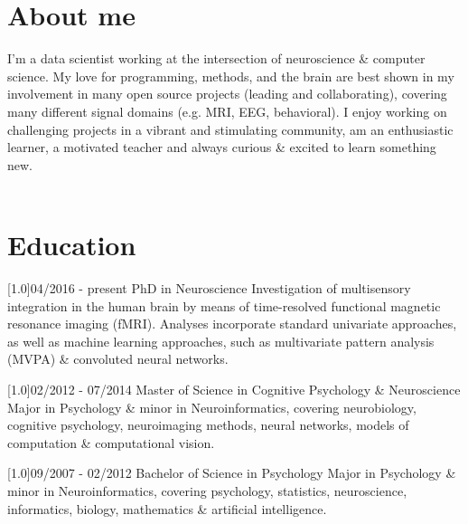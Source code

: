 \documentclass[english]{cv-style}
\begin{document}
\section{About me}
  \vspace{-0.2cm}
I'm a data scientist working at the intersection of neuroscience \& computer science. My love for programming, methods, and the brain are best shown in my involvement in many open source projects (leading and collaborating), covering many different signal domains (e.g. MRI, EEG, behavioral). I enjoy working on challenging projects in a vibrant and stimulating community, am an enthusiastic learner, a motivated teacher and always curious \& excited to learn something new.\\
~
\section{Education}
\begin{entrylist}
\entry
  {\scalebox{.8}[1.0]{04/2016 - present}}
  {PhD in Neuroscience}
  {}
  {Investigation of multisensory integration in the human brain by means of time-resolved functional magnetic resonance imaging (fMRI). Analyses incorporate standard univariate approaches, as well as machine learning approaches, such as multivariate pattern analysis (MVPA) \& convoluted neural networks.\\}
\end{entrylist}
\begin{entrylist}
\entry
  {\scalebox{.8}[1.0]{02/2012 - 07/2014}}
  {Master of Science in Cognitive Psychology \& Neuroscience}
  {}
  {Major in Psychology \& minor in Neuroinformatics, covering neurobiology, cognitive psychology, neuroimaging methods, neural networks, models of computation \& computational vision.\\}
\end{entrylist}
\begin{entrylist}
\entry
  {\scalebox{.8}[1.0]{09/2007 - 02/2012}}
  {Bachelor of Science in Psychology}
  {}
  {Major in Psychology \& minor in Neuroinformatics, covering psychology, statistics, neuroscience, informatics, biology, mathematics \& artificial intelligence.}
\end{entrylist}
\end{document}
